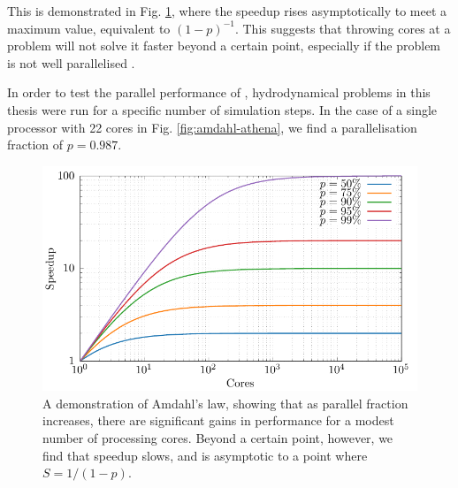 \noindent
This is demonstrated in Fig. \ref{fig:amdahl-demonstration}, where the speedup rises asymptotically to meet a maximum value, equivalent to $(1-p)^{-1}$.
This suggests that throwing cores at a problem will not solve it faster beyond a certain point, especially if the problem is not well parallelised \parencite[Ch.~2]{trobecIntroductionParallelComputing2018}.

In order to test the parallel performance of \athena{}, hydrodynamical problems in this thesis were run for a specific number of simulation steps.
In the case of a single processor with 22 cores in Fig. \ref{fig:amdahl-athena}, we find a parallelisation fraction of $p=0.987$.

\begin{figure}[ht]
  \centering
  \includegraphics{assets/Amdahl/amdahl.pdf}
  \caption[Demonstration of Amhdal's law]{A demonstration of Amdahl's law, showing that as parallel fraction increases, there are significant gains in performance for a modest number of processing cores. Beyond a certain point, however, we find that speedup slows, and is asymptotic to a point where $S = 1/(1-p)$.}
  \label{fig:amdahl-demonstration}
\end{figure}

